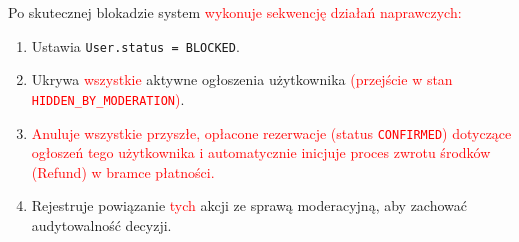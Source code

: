 \documentclass[11pt, a4paper]{article}
\begin{document}
\noindent Po skutecznej blokadzie system \textcolor{red}{wykonuje sekwencję działań naprawczych:}
\begin{enumerate}
    \item Ustawia \texttt{User.status = BLOCKED}.
    \item Ukrywa \textcolor{red}{wszystkie} aktywne ogłoszenia użytkownika \textcolor{red}{(przejście w stan \texttt{HIDDEN\_BY\_MODERATION})}.
    \item \textcolor{red}{Anuluje wszystkie przyszłe, opłacone rezerwacje (status \texttt{CONFIRMED}) dotyczące ogłoszeń tego użytkownika i automatycznie inicjuje proces zwrotu środków (Refund) w bramce płatności.}
    \item Rejestruje powiązanie \textcolor{red}{tych} akcji ze sprawą moderacyjną, aby zachować audytowalność decyzji.
\end{enumerate}
\end{document}
